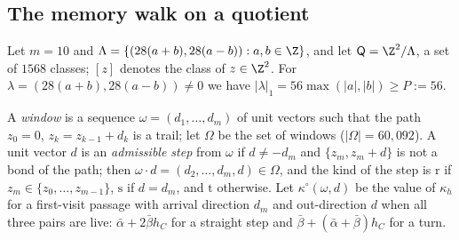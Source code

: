 \subsection{The memory walk on a quotient}\label{s:memwalk}

Let $m = 10$ and $\Lambda = \{ (28(a + b), 28(a - b)) : a, b \in \Z \}$, and let $\mathsf Q = \Z^2/\Lambda$, a set of $1568$ classes; $[z]$ denotes the class of $z \in \Z^2$. For $\lambda = (28(a + b), 28(a - b)) \neq 0$ we have $|\lambda|_1 = 56 \max(|a|, |b|) \ge P := 56$.

A \emph{window} is a sequence $\omega = (d_1, \dots, d_m)$ of unit vectors such that the path $z_0 = 0$, $z_k = z_{k - 1} + d_k$ is a trail; let $\Omega$ be the set of windows ($|\Omega| = 60{,}092$). A unit vector $d$ is an \emph{admissible step} from $\omega$ if $d \neq -d_m$ and $\{z_m, z_m + d\}$ is not a bond of the path; then $\omega \cdot d = (d_2, \dots, d_m, d) \in \Omega$, and the kind of the step is $\mathrm r$ if $z_m \in \{z_0, \dots, z_{m - 1}\}$, $\mathrm s$ if $d = d_m$, and $\mathrm t$ otherwise. Let $\kappa^\circ(\omega, d)$ be the value of $\kappa_h$ for a first-visit passage with arrival direction $d_m$ and out-direction $d$ when all three pairs are live: $\bar\alpha + 2 \bar\beta h_C$ for a straight step and $\bar\beta + (\bar\alpha + \bar\beta) h_C$ for a turn.

